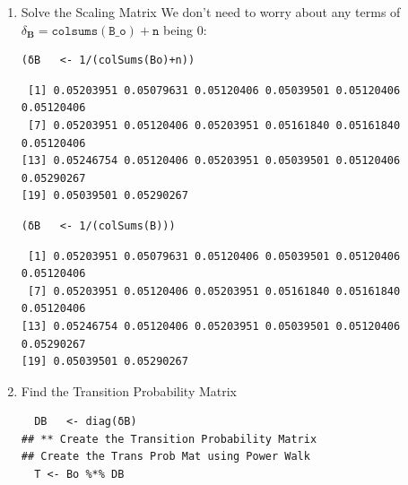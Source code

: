 \documentclass[11pt]{article}
\begin{document}
\begin{enumerate}
\begin{verbatim}
 [1,]    -0.16 .        .           -0.16
 [2,] .        .        .        .
 [3,] .        .        .        .
 [4,] .        .        .        .
 [5,] .        .        .        .
 [6,] .        .        .           -0.16
 [7,] .           -0.16 .           -0.16
 [8,] .        .        .        .
 [9,] .           -0.16 .           -0.16
[10,]    -0.16 .           -0.16 .
[11,]    -0.16 .        .        .
[12,] .           -0.16 .        .
[13,] .           -0.16 .        .
[14,] .           -0.16 .           -0.16
[15,] .           -0.16 .        .
[16,] .        .        .           -0.16
[17,] .        .        .        .
[18,] .        .        .           -0.16
[19,] .        .        .        .
[20,] .           -0.16 .        .
\end{verbatim}

\item Solve the Scaling Matrix
\label{sec:org47ed8a0}
We don't need to worry about any terms of \(\delta_{\mathbf{B}} = \mathtt{colsums\left(B\_o\right)+n}\) being 0:

\lstset{language=r,label= ,caption= ,captionpos=b,numbers=none}
\begin{lstlisting}
(δB   <- 1/(colSums(Bo)+n))
\end{lstlisting}

\begin{verbatim}
 [1] 0.05203951 0.05079631 0.05120406 0.05039501 0.05120406 0.05120406
 [7] 0.05203951 0.05120406 0.05203951 0.05161840 0.05161840 0.05120406
[13] 0.05246754 0.05120406 0.05203951 0.05039501 0.05120406 0.05290267
[19] 0.05039501 0.05290267
\end{verbatim}


\lstset{language=r,label= ,caption= ,captionpos=b,numbers=none}
\begin{lstlisting}
(δB   <- 1/(colSums(B)))
\end{lstlisting}

\begin{verbatim}
 [1] 0.05203951 0.05079631 0.05120406 0.05039501 0.05120406 0.05120406
 [7] 0.05203951 0.05120406 0.05203951 0.05161840 0.05161840 0.05120406
[13] 0.05246754 0.05120406 0.05203951 0.05039501 0.05120406 0.05290267
[19] 0.05039501 0.05290267
\end{verbatim}


\item Find the Transition Probability Matrix
\label{sec:org575e386}
\lstset{language=r,label= ,caption= ,captionpos=b,numbers=none}
\begin{lstlisting}
  DB   <- diag(δB)
## ** Create the Transition Probability Matrix
## Create the Trans Prob Mat using Power Walk
  T <- Bo %*% DB
\end{lstlisting}


\end{enumerate}
\end{document}
